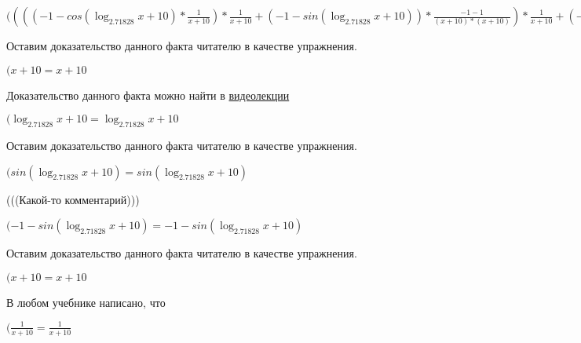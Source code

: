 \documentclass[12pt,a4paper,fleqn]{article}
\theoremstyle{definition}
\begin{document}
$(((( -1  - cos(\log_{ 2.71828 }{ x  +  10 }) * \frac{ 1 }{ x  +  10 }
) * \frac{ 1 }{ x  +  10 }
 + ( -1  - sin(\log_{ 2.71828 }{ x  +  10 })) * \frac{ -1  -  1 }{( x  +  10 ) * ( x  +  10 )}
) * \frac{ 1 }{ x  +  10 }
 + ( -1  - sin(\log_{ 2.71828 }{ x  +  10 })) * \frac{ 1 }{ x  +  10 }
 * \frac{ -1  -  1 }{( x  +  10 ) * ( x  +  10 )}
 + ( -1  - sin(\log_{ 2.71828 }{ x  +  10 })) * \frac{ 1 }{ x  +  10 }
 * \frac{ -2 }{( x  +  10 ) * ( x  +  10 )}
 + cos(\log_{ 2.71828 }{ x  +  10 }) * \frac{ -1  -  -2  * ( x  +  10  +  x  +  10 )}{( x  +  10 ) * ( x  +  10 ) * ( x  +  10 ) * ( x  +  10 )}
) * cos(\log_{ 2.71828 }{ x  +  10 }) * \frac{ 1 }{ x  +  10 }
 * { 3 }^{sin(\log_{ 2.71828 }{ x  +  10 })} = ((( -1  - cos(\log_{ 2.71828 }{ x  +  10 }) * \frac{ 1 }{ x  +  10 }
) * \frac{ 1 }{ x  +  10 }
 + ( -1  - sin(\log_{ 2.71828 }{ x  +  10 })) * \frac{ -1  -  1 }{( x  +  10 ) * ( x  +  10 )}
) * \frac{ 1 }{ x  +  10 }
 + ( -1  - sin(\log_{ 2.71828 }{ x  +  10 })) * \frac{ 1 }{ x  +  10 }
 * \frac{ -1  -  1 }{( x  +  10 ) * ( x  +  10 )}
 + ( -1  - sin(\log_{ 2.71828 }{ x  +  10 })) * \frac{ 1 }{ x  +  10 }
 * \frac{ -2 }{( x  +  10 ) * ( x  +  10 )}
 + cos(\log_{ 2.71828 }{ x  +  10 }) * \frac{ -1  -  -2  * ( x  +  10  +  x  +  10 )}{( x  +  10 ) * ( x  +  10 ) * ( x  +  10 ) * ( x  +  10 )}
) * cos(\log_{ 2.71828 }{ x  +  10 }) * \frac{ 1 }{ x  +  10 }
 * { 3 }^{sin(\log_{ 2.71828 }{ x  +  10 })}$

Оставим доказательство данного факта читателю в качестве упражнения.

$( x  +  10  =  x  +  10 $

Доказательство данного факта можно найти в \href{https://www.youtube.com/watch?v=dQw4w9WgXcQ}{видеолекции}

$(\log_{ 2.71828 }{ x  +  10 } = \log_{ 2.71828 }{ x  +  10 }$

Оставим доказательство данного факта читателю в качестве упражнения.

$(sin(\log_{ 2.71828 }{ x  +  10 }) = sin(\log_{ 2.71828 }{ x  +  10 })$

(((Какой-то комментарий)))

$( -1  - sin(\log_{ 2.71828 }{ x  +  10 }) =  -1  - sin(\log_{ 2.71828 }{ x  +  10 })$

Оставим доказательство данного факта читателю в качестве упражнения.

$( x  +  10  =  x  +  10 $

В любом учебнике написано, что

$(\frac{ 1 }{ x  +  10 }
 = \frac{ 1 }{ x  +  10 }
$
\end{document}
